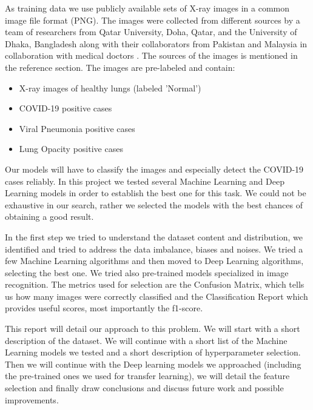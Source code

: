 \documentclass{article}
\begin{document}
As training data we use publicly available sets of X-ray images in a common image file format (PNG). The images were collected from different sources by a team of researchers from Qatar University, Doha, Qatar, and the University of Dhaka, Bangladesh along with their collaborators from Pakistan and Malaysia in collaboration with medical doctors \cite{chowdhury2020} \cite{rahman2020}. The sources of the images is mentioned in the reference section. The images are pre-labeled and contain:
\begin{itemize}
    \item X-ray images of healthy lungs (labeled 'Normal')
    \item COVID-19 positive cases
    \item  Viral Pneumonia positive cases
    \item  Lung Opacity positive cases
\end{itemize}
 
Our models will have to classify the images and especially detect the COVID-19 cases reliably. In this project we tested several Machine Learning and Deep Learning models in order to establish the best one for this task. We could not be exhaustive in our search, rather we selected the models with the best chances of obtaining a good result.

In the first step we tried to understand the dataset content and distribution, we identified and tried to address the data imbalance, biases and noises. We tried a few Machine Learning algorithms and then moved to Deep Learning algorithms, selecting the best one. We tried also pre-trained models specialized in image recognition. The metrics used for selection are the Confusion Matrix, which tells us how many images were correctly classified and the Classification Report which provides useful scores, most importantly the f1-score.

This report will detail our approach to this problem. We will start with a short description of the dataset. We will continue with a short list of the Machine Learning models we tested and a short description of hyperparameter selection. Then we will continue with the Deep learning models we approached (including the pre-trained ones we used for transfer learning), we will detail the feature selection and finally draw conclusions and discuss future work and possible improvements.  

\end{document}
